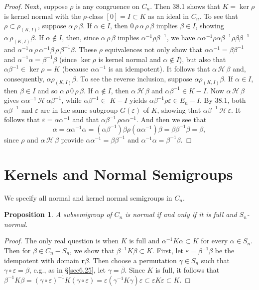 \documentclass{surv-l}
\numberwithin{equation}{section}
\numberwithin{table}{section}
\numberwithin{figure}{section}
\theoremstyle{plain}
\newtheorem{proposition}[equation]{Proposition}
\theoremstyle{definition}
\begin{document}
\begin{proof}
Next, suppose $\rho$ is any congruence on $C_{n}$. Then 38.1 shows
that $K= \ker\rho$ is kernel normal with the
$\rho$-class $[0]= I \subset K$ as an ideal in $C_{n}$. To see
that $\rho\subset\rho_{(K,I)}$, suppose $\alpha\,\rho\,\beta$. If
$\alpha\in I$, then $0\,\rho\,\alpha\,\rho\,\beta$ implies $\beta\in I$,
showing $\alpha\,\rho_{(K,I)}\beta$. If $\alpha\not\in I$, then,
since $\alpha\,\rho\,\beta$ implies $\alpha^{-1}\rho\beta^{-1}$, we
have $\alpha\alpha^{-1}\rho\alpha\beta^{-1}\rho\beta\beta^{-1}$
and $\alpha^{-1}\alpha\,\rho\,\alpha^{-1}\beta\,\rho\,\beta^{-1}\beta$.
These $\rho$ equivalences not only show that
$\alpha\alpha^{-1}=\beta\beta^{-1}$ and
$\alpha^{-1}\alpha=\beta^{-1}\beta$ (since $\ker \rho$ is
kernel normal and $\alpha\not\in I$), but also that
$\alpha\beta^{-1}\in \ker \rho=K$ (because
$\alpha\alpha^{-1}$ is an idempotent). It follows that $\alpha\,\mathcal{H}\,\beta$ and, consequently, $\alpha\rho_{(K,I)}\beta$. To
see the reverse inclusion, suppose $\alpha\rho_{(K,I)}\beta$. If
$\alpha\in I$, then $\beta\in I$ and so $\alpha\,\rho \,0\,\rho\,\beta$.
If $\alpha\not\in I$, then $\alpha\,\mathcal{H}\,\beta$ and
$\alpha\beta^{-1}\in K-I$. Now $\alpha\,\mathcal{H}\,\beta$ gives
$\alpha\alpha^{-1}\,\mathcal{H}\,\alpha\beta^{-1}$, while
$\alpha\beta^{-1}\in$ $K-I$ yields
$\alpha\beta^{-1}\rho\varepsilon\in E_{n}- I$. By 38.1, both
$\alpha\beta^{-1}$ and $\varepsilon$ are in the same subgroup
$G(\varepsilon)$ of $K$, showing that
$\alpha\beta^{-1}\,\mathcal{H}\,\varepsilon$. It follows that
$\varepsilon=\alpha\alpha^{-1}$ and that
$\alpha\beta^{-1}\,\rho\alpha\alpha^{-1}$. And then we see that
\[
\alpha=\alpha\alpha^{-1}\alpha=(\alpha\beta^{-1})\beta\rho(\alpha\alpha^{-1})\beta=\beta\beta^{-1}\beta=\beta,
\]
since $\rho$ and $\alpha\,\mathcal{H}\,\beta$ provide
$\alpha\alpha^{-1}=\beta\beta^{-1}$ and
$\alpha^{-1}\alpha=\beta^{-1}\beta.$
\end{proof}

\section{Kernels and Normal Semigroups}\label{sec8.39}

We specify all normal and kernel normal semigroups in $C_{n}$.

\begin{proposition}\label{prop8.39.1}
A subsemigroup of $C_{n}$ is normal if and only if it is full and
$S_{n}$-normal.
\end{proposition}

\begin{proof} The only real question is when $K$ is full and
$\alpha^{-1}K\alpha\subset K$ for every $\alpha\in S_{n}$. Then
for $\beta\in C_{n}-S_{n}$, we show that $\beta^{-1}K\beta\subset
K$. First, let $\varepsilon =\beta^{-1}\beta$ be the idempotent
with domain $\mathbf{r}\beta$. Then choose a permutation
$\gamma\in S_{n}$ such that $\gamma \circ \varepsilon =\beta$,
e.g., as in \S\ref{sec6.25}, let $\gamma=\overline{\beta}$. Since
$K$ is full, it follows that
$\beta^{-1}K\beta=(\gamma\circ\varepsilon)^{-1}K(\gamma\circ\varepsilon)
=\varepsilon(\gamma^{-1}K\gamma)\varepsilon\subset\varepsilon
K\varepsilon \subset K$.
\end{proof}
\end{document}
